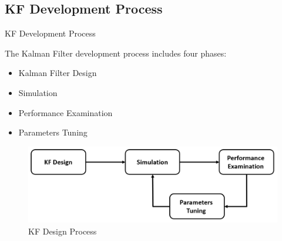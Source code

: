 \subsection{KF Development Process}
\begin{frame}{KF Development Process}

    The Kalman Filter development process includes four phases:
    \begin{itemize}
        \item Kalman Filter Design
        \item Simulation
        \item Performance Examination
        \item Parameters Tuning
    \end{itemize}
\begin{figure}
    \centering
    \includegraphics[width=0.6\linewidth]{Figures//Part4/KFDesignProcess.png}
    \caption{KF Design Process}
\end{figure}


\end{frame}


